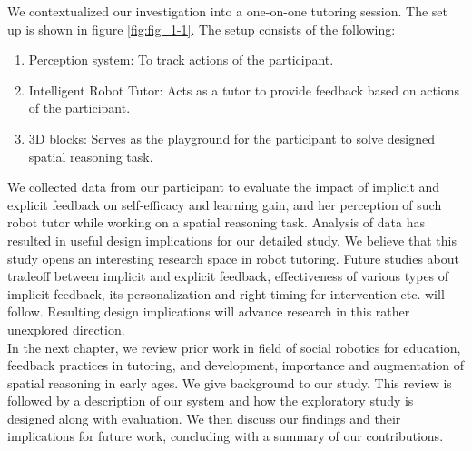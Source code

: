 We contextualized our investigation into a one-on-one tutoring session. The set up is shown in figure \ref{fig:fig_1-1}.  The setup consists of the following:
\begin{enumerate}
    \item Perception system: To track actions of the participant. 
    \item Intelligent Robot Tutor: Acts as a tutor to provide feedback based on actions of the participant.
    \item 3D blocks: Serves as the playground for the participant to solve designed spatial reasoning task. 
\end{enumerate}
We collected data from our participant to evaluate the impact of implicit and explicit feedback on self-efficacy and learning gain, and her perception of such robot tutor while working on a spatial reasoning task. Analysis of data has resulted in useful design implications for our detailed study. We believe that this study opens an interesting research space in robot tutoring. Future studies about tradeoff between implicit and explicit feedback, effectiveness of various types of implicit feedback, its personalization and right timing for intervention etc. will follow. Resulting design implications will advance research in this rather unexplored direction. \\
In the next chapter, we review prior work in field of social robotics for education, feedback practices in tutoring, and development, importance and augmentation of spatial reasoning in early ages. We give background to our study. This review is followed by a description of our system and how the exploratory study is designed along with evaluation. We then discuss our findings and their implications for future work, concluding with a summary of our contributions.

